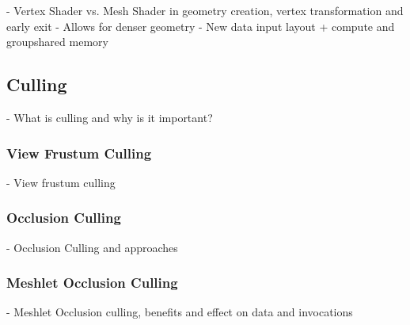 - Vertex Shader vs. Mesh Shader in geometry creation, vertex transformation and early exit
- Allows for denser geometry 
- New data input layout + compute and groupshared memory

\subsection{Culling} \label{subsec-culling}

- What is culling and why is it important?

\subsubsection{View Frustum Culling} \label{subsubsec-view-frustum-culling}

- View frustum culling

\subsubsection{Occlusion Culling} \label{subsubsec-occ-culling}

- Occlusion Culling and approaches

\subsubsection{Meshlet Occlusion Culling} \label{subsubsec-meshlet-occ-culling}

- Meshlet Occlusion culling, benefits and effect on data and invocations


